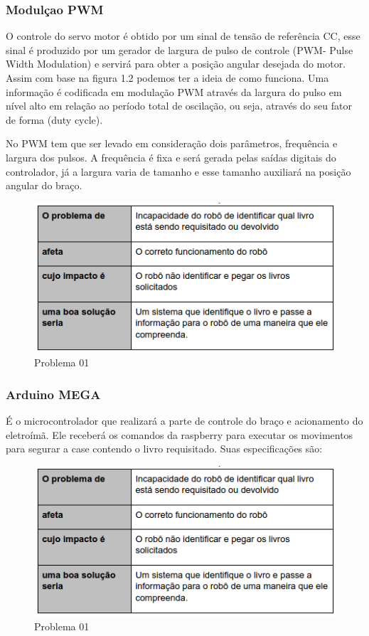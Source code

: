 \subsubsection{Modulçao PWM}

O controle do servo motor é obtido por um sinal de tensão de referência CC, esse sinal é produzido por um gerador de largura de pulso de controle (PWM- Pulse Width Modulation) e servirá para obter a posição angular desejada do motor. Assim com base na figura 1.2 podemos ter a ideia de como funciona. Uma informação é codificada em modulação PWM através da largura do pulso em nível alto em relação ao período total de oscilação, ou seja, através do seu fator de forma (duty cycle).

No PWM tem que ser levado em consideração dois parâmetros, frequência e largura dos pulsos. A frequência é fixa e será gerada pelas saídas digitais do controlador, já a largura varia de tamanho e esse tamanho auxiliará na posição angular do braço.

\begin{figure}[!h]
\centering
\includegraphics[scale=0.65, angle = 360]{figuras/descricao_problema1}
\caption[]{Problema 01 \footnotemark}
\end{figure}
\FloatBarrier



\subsubsection{Arduino MEGA}
É o microcontrolador que realizará a parte de controle do braço e acionamento do eletroímã. Ele receberá os comandos da raspberry para executar os movimentos para segurar a case contendo o livro requisitado. Suas especificações são:

\begin{figure}[!h]
\centering
\includegraphics[scale=0.65, angle = 360]{figuras/descricao_problema1}
\caption[]{Problema 01 \footnotemark}
\end{figure}
\FloatBarrier


